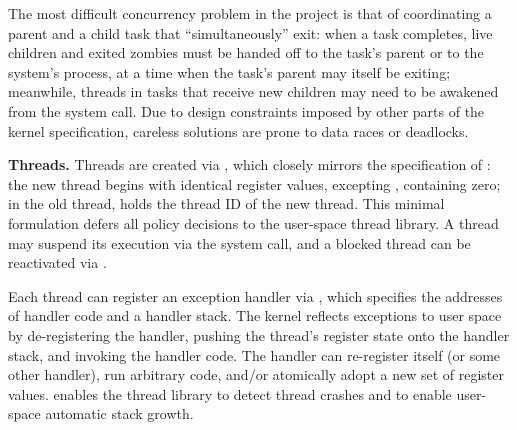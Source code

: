 The most difficult concurrency problem in the project
is that of coordinating a parent and a child task that ``simultaneously''
exit:
when a task completes,
live children and exited zombies must be handed off
to the task's parent or to the system's  process,
at a time when the task's parent may itself be
exiting;
meanwhile, threads in tasks that receive new children
may need to be awakened from the  system call.
Due to design constraints imposed by other parts of the kernel specification,
careless solutions %
are prone to data races or deadlocks.

{\bf Threads.}
Threads are created via
, which closely
mirrors the specification of :
the new thread begins with identical %
register values,
excepting , containing zero;
in the old thread,  holds the thread ID
of the new thread.
This minimal formulation defers all policy decisions
to the
user-space thread library.
A thread may suspend its execution via the
 system call,
and a blocked thread can be reactivated via
.

Each thread
can register an exception handler
via ,
which specifies the addresses of handler code
and a handler stack.
The kernel reflects exceptions to user space
by
de-registering the handler,
pushing the thread's register state onto the handler stack,
and invoking the handler code.
The handler
can re-register itself
(or some other handler),
run arbitrary code,
and/or atomically adopt a new set of register
values.
 enables
the thread library to detect %
thread crashes
and %
to enable user-space automatic stack growth.



